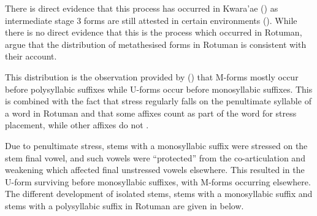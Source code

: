 \begin{exe}\let\eachwordone=\textnormal
	\label{ex:ComMet}
\end{exe}

There is direct evidence that this process has occurred in Kwara'ae ()
as intermediate stage 3 forms are still attested in certain environments ().
While there is no direct evidence that this is the process which occurred in Rotuman,
\cite{blga98} argue that the distribution of metathesised forms in Rotuman
is consistent with their account.

This distribution is the observation provided by \cite{haki98} ()
that M-forms mostly occur before polysyllabic suffixes
while U-forms occur before monosyllabic suffixes.
This is combined with the fact that stress regularly falls
on the penultimate syllable of a word in Rotuman and that
some affixes count as part of the word for stress placement,
while other affixes do not \citep[75]{ch40}.

Due to penultimate stress, stems with a monosyllabic suffix 
were stressed on the stem final vowel,
and such vowels were ``protected'' from the co-articulation
and weakening which affected final unstressed vowels elsewhere.
This resulted in the U-form surviving before monosyllabic suffixes,
with M-forms occurring elsewhere.
The different development of isolated stems,
stems with a monosyllabic suffix and stems with a
polysyllabic suffix in Rotuman are given in  below.

\begin{exe}
	\label{ex:DevRotShoFor}
\end{exe}

